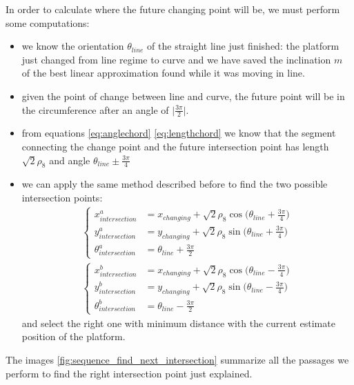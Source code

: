 \begin{itemize}
In order to calculate where the future changing point will be, we must perform some computations:
\begin{itemize}
\item we know the orientation $\theta_{line}$ of the straight line just finished: the platform just changed from line regime to curve and we have saved the inclination $m$ of the best linear approximation found while it was moving in line.
\item given the point of change between line and curve, the future point will be in the circumference after an angle of $\big | \frac{3\pi}{2} \big |$.
\item from equations \ref{eq:anglechord} \ref{eq:lengthchord} we know that the segment connecting the change point and the future intersection point has length $\sqrt{2}\rho_8$ and angle $\theta_{line} \pm \frac{3\pi}{4} $
\item we can apply the same method described before to find the two possible intersection points:
\begin{align*}
\begin{cases}
x_{intersection}^a &= x_{changing} + \sqrt{2}\rho_8\cos{\Big(\theta_{line} + \frac{3\pi}{4}\Big) }\\[5pt]
y_{intersection}^a &= y_{changing} + \sqrt{2}\rho_8\sin{\Big(\theta_{line} + \frac{3\pi}{4}\Big) }\\[5pt]
\theta_{intersection}^a &=  \theta_{line} + \frac{3\pi}{2}
\end{cases}
\end{align*}
\begin{align*}
\begin{cases}
x_{intersection}^b &= x_{changing} + \sqrt{2}\rho_8\cos{\Big(\theta_{line} - \frac{3\pi}{4}\Big) }\\[5pt]
y_{intersection}^b &= y_{changing} + \sqrt{2}\rho_8\sin{\Big(\theta_{line} - \frac{3\pi}{4}\Big) }\\[5pt]
\theta_{intersection}^b &=  \theta_{line} - \frac{3\pi}{2}
\end{cases}
\end{align*}
and select the right one with minimum distance with the current estimate position of the platform.
\end{itemize}


The images  \ref{fig:sequence_find_next_intersection} summarize all the passages we perform to find the right intersection point just explained.


\end{itemize}
